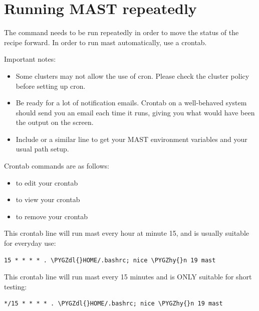 \documentclass[letterpaper,10pt,english]{sphinxmanual}
\def\PYGZdl{\char`\$}
\def\PYGZhy{\char`\-}
\begin{document}
\section{Running MAST repeatedly}
\label{5_0_runningmast:running-mast-repeatedly}
The command  needs to be run repeatedly in order to move the status of the recipe forward. In order to run mast automatically, use a crontab.

Important notes:
\begin{itemize}
\item {} 
Some clusters may not allow the use of cron. Please check the cluster policy before setting up cron.

\item {} 
Be ready for a lot of notification emails. Crontab on a well-behaved system should send you an email each time it runs, giving you what would have been the output on the screen.

\item {} 
Include  or a similar line to get your MAST environment variables and your usual path setup.

\end{itemize}

Crontab commands are as follows:
\begin{itemize}
\item {} 
 to edit your crontab

\item {} 
 to view your crontab

\item {} 
 to remove your crontab

\end{itemize}

This crontab line will run mast every hour at minute 15, and is usually suitable for everyday use:

\begin{Verbatim}[commandchars=\\\{\}]
15 * * * * . \PYGZdl{}HOME/.bashrc; nice \PYGZhy{}n 19 mast
\end{Verbatim}

This crontab line will run mast every 15 minutes and is ONLY suitable for short testing:

\begin{Verbatim}[commandchars=\\\{\}]
*/15 * * * * . \PYGZdl{}HOME/.bashrc; nice \PYGZhy{}n 19 mast
\end{Verbatim}
\end{document}
